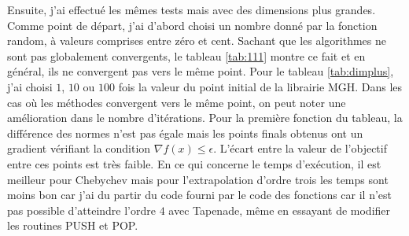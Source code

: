 Ensuite, j'ai effectu\'e les mêmes tests mais avec des dimensions plus grandes. Comme point de d\'epart,
j'ai d'abord choisi un nombre donn\'e par la fonction random, \`a valeurs comprises entre z\'ero et cent. Sachant que les algorithmes ne sont pas 
globalement convergents, le tableau \ref{tab:111} montre ce fait et en g\'en\'eral, ils ne convergent pas vers le même point.
Pour le tableau \ref{tab:dimplus}, j'ai choisi $1$, $10$ ou $100$ fois la valeur du point initial de la librairie MGH. Dans les cas o\`u 
les m\'ethodes convergent vers le même point, on peut noter une am\'elioration dans le nombre d'it\'erations. {\co
Pour la premi\`ere fonction du tableau, la diff\'erence des normes n'est pas \'egale mais les points finals obtenus ont un gradient v\'erifiant la condition
$\nabla f(x) \leq \epsilon$. L'\'ecart entre la valeur de l'objectif entre ces points est tr\`es faible. }
 En ce qui concerne le temps d'ex\'ecution,
il est meilleur pour Chebychev mais pour l'extrapolation d'ordre trois les temps sont moins bon car j'ai du partir du code fourni par le code des fonctions
car il n'est pas possible d'atteindre l'ordre $4$ avec Tapenade, même en essayant de modifier les routines PUSH et POP.
 



